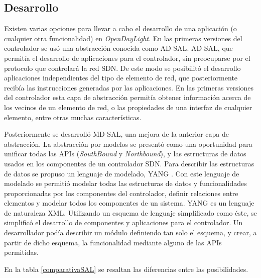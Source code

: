 \documentclass[a4paper,11pt]{book}
\begin{document}
\subsection{Desarrollo}\label{sub:desarrollo}
Existen varias opciones para llevar a cabo el desarrollo de una aplicación (o cualquier otra funcionalidad) en \emph{OpenDayLight}. En las primeras versiones del controlador se usó una abstracción conocida como \ac{AD}-\ac{SAL}. \ac{AD}-\ac{SAL}, que permitía el desarrollo de aplicaciones para el controlador, sin preocuparse por el protocolo que controlará la red \ac{SDN}. De este modo se posibilitó el desarrollo aplicaciones independientes del tipo de elemento de red, que posteriormente recibía las instrucciones generadas por las aplicaciones. En las primeras versiones del controlador esta capa de abstracción permitía obtener información acerca de los vecinos de un elemento de red, o las propiedades de una interfaz de cualquier elemento, entre otras muchas características.

Posteriormente se desarrolló \ac{MD}-\ac{SAL}, una mejora de la anterior capa de abstracción. La abstracción por modelos se presentó como una oportunidad para unificar todas las \ac{API}s (\textit{SouthBound} y \textit{Northbound}), y las estructuras de datos usados en los componentes de un controlador \ac{SDN}. Para describir las estructuras de datos se propuso un lenguaje de modelado, YANG \cite{bjorklund2009yang}. Con este lenguaje de modelado se permitió modelar todas las estructuras de datos y funcionalidades proporcionadas por los componentes del controlador, definir relaciones entre elementos y modelar todos los componentes de un sistema. YANG es un lenguaje de naturaleza \ac{XML}. Utilizando un esquema de lenguaje simplificado como éste, se simplificó el desarrollo de componentes y aplicaciones para el controlador. Un desarrollador podía describir un módulo definiendo tan solo el esquema, y crear, a partir de dicho esquema, la funcionalidad mediante alguno de las \ac{API}s permitidas.

En la tabla \ref{comparativaSAL} se resaltan las diferencias entre las posibilidades.
\end{document}
